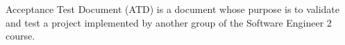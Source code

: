 Acceptance Test Document (ATD) is a document whose purpose is to validate and test a project implemented by another group of the Software Engineer 2 course.


